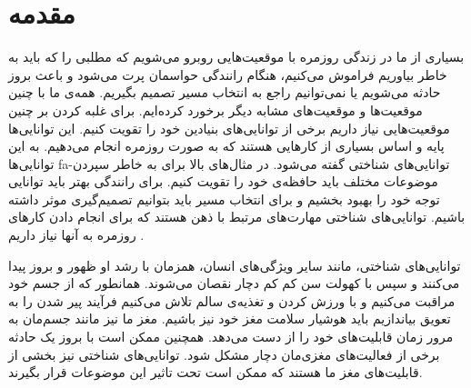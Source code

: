 \documentclass[twoside, a4paper,11pt]{book}
\numberwithin{equation}{chapter}
\numberwithin{table}{chapter}
\numberwithin{figure}{chapter}
\numberwithin{equation}{chapter}
\newcommand{\mls}[1]{\gls{fa-#1}\glsuseri{la-#1}}
\begin{document}


\newpage
\thispagestyle{empty}
\mbox{}

\renewcommand\listfigurename{فهرست شکل‌ها}
\renewcommand\listtablename{فهرست جدول‌ها}

\begin{doublespace}\small{
\tableofcontents
\listoftables
\listoffigures
}\end{doublespace}





\pagestyle{fancy}	
\fancyhead{} 
\fancyhead[RO]{\leftmark}
\fancyhead[LO]{\thepage}
\fancyhead[LE]{\rightmark}
\fancyhead[RE]{\thepage}
\fancyfoot{} 
\renewcommand{\headrulewidth}{0.6pt} 
\renewcommand{\footrulewidth}{0pt}

\chapter{مقدمه}
\label{chapter:introduction}
\setcounter{page}{1}
\thispagestyle{plain}

بسیاری از ما در زندگی روزمره با موقعیت‌هایی روبرو می‌شویم که مطلبی را که باید به خاطر بیاوریم فراموش می‌کنیم، هنگام رانندگی حواسمان پرت می‌شود و باعث بروز حادثه می‌شویم یا نمی‌توانیم راجع به انتخاب مسیر تصمیم بگیریم. همه‌ی ما با چنین موقعیت‌ها و موقعیت‌های مشابه دیگر برخورد کرده‌ایم. برای غلبه کردن بر چنین موقعیت‌هایی نیاز داریم برخی از توانایی‌های بنیادین خود را تقویت کنیم. این توانایی‌ها پایه و اساس بسیاری از کارهایی هستند که به صورت روزمره انجام می‌دهیم. به این توانایی‌ها \mls{توانایی‌های شناختی} گفته می‌شود. در مثال‌های بالا برای به خاطر سپردن موضوعات مختلف باید حافظه‌ی خود را تقویت کنیم. برای رانندگی بهتر باید توانایی توجه خود را بهبود بخشیم و برای انتخاب مسیر باید بتوانیم تصمیم‌گیری موثر داشته باشیم. توانایی‌های شناختی مهارت‌های مرتبط با ذهن هستند که برای انجام دادن کارهای روزمره به آنها نیاز داریم \cite{fernandez2013sharpBrainsBook}. 

توانایی‌های شناختی، مانند سایر ویژگی‌های انسان، همزمان با رشد او ظهور و بروز پیدا می‌کنند و سپس با کهولت سن کم کم دچار نقصان می‌شوند. همانطور که از جسم خود مراقبت می‌کنیم و با ورزش کردن و تغذیه‌ی سالم تلاش می‌کنیم فرآیند پیر شدن را به تعویق بیاندازیم باید هوشیار سلامت مغز خود نیز باشیم. مغز ما نیز مانند جسم‌مان به مرور زمان قابلیت‌های خود را از دست می‌دهد. همچنین ممکن است با بروز یک حادثه برخی از فعالیت‌های مغزی‌مان دچار مشکل شود. توانایی‌های شناختی نیز بخشی از قابلیت‌های مغز ما هستند که ممکن است تحت تاثیر این موضوعات قرار بگیرند.
\end{document}
